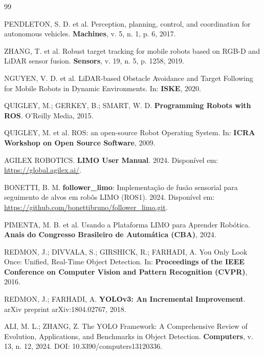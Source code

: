 \newpage
{}

\begin{thebibliography}{99}

PENDLETON, S. D. et al. Perception, planning, control, and coordination for autonomous vehicles. \textbf{Machines}, v. 5, n. 1, p. 6, 2017.

ZHANG, T. et al. Robust target tracking for mobile robots based on RGB-D and LiDAR sensor fusion. \textbf{Sensors}, v. 19, n. 5, p. 1258, 2019.

NGUYEN, V. D. et al. LiDAR-based Obstacle Avoidance and Target Following for Mobile Robots in Dynamic Environments. In: \textbf{ISKE}, 2020.

QUIGLEY, M.; GERKEY, B.; SMART, W. D. \textbf{Programming Robots with ROS}. O'Reilly Media, 2015.

QUIGLEY, M. et al. ROS: an open-source Robot Operating System. In: \textbf{ICRA Workshop on Open Source Software}, 2009.

AGILEX ROBOTICS. \textbf{LIMO User Manual}. 2024. Disponível em: \url{https://global.agilex.ai/}.

BONETTI, B. M. \textbf{follower\_limo}: Implementação de fusão sensorial para seguimento de alvos em robôs LIMO (ROS1). 2024. Disponível em: \url{https://github.com/bonettibruno/follower_limo.git}.

PIMENTA, M. B. et al. Usando a Plataforma LIMO para Aprender Robótica. \textbf{Anais do Congresso Brasileiro de Automática (CBA)}, 2024.

REDMON, J.; DIVVALA, S.; GIRSHICK, R.; FARHADI, A. You Only Look Once: Unified, Real-Time Object Detection. In: \textbf{Proceedings of the IEEE Conference on Computer Vision and Pattern Recognition (CVPR)}, 2016.

REDMON, J.; FARHADI, A. \textbf{YOLOv3: An Incremental Improvement}. arXiv preprint arXiv:1804.02767, 2018.

ALI, M. L.; ZHANG, Z. The YOLO Framework: A Comprehensive Review of Evolution, Applications, and Benchmarks in Object Detection. \textbf{Computers}, v. 13, n. 12, 2024. DOI: 10.3390/computers13120336.


\end{thebibliography}
